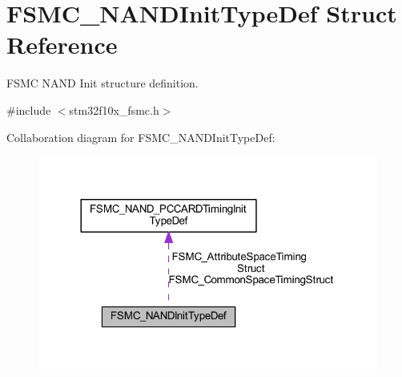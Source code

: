 \hypertarget{struct_f_s_m_c___n_a_n_d_init_type_def}{}\section{F\+S\+M\+C\+\_\+\+N\+A\+N\+D\+Init\+Type\+Def Struct Reference}
\label{struct_f_s_m_c___n_a_n_d_init_type_def}


F\+S\+MC N\+A\+ND Init structure definition.  




{\ttfamily \#include $<$stm32f10x\+\_\+fsmc.\+h$>$}



Collaboration diagram for F\+S\+M\+C\+\_\+\+N\+A\+N\+D\+Init\+Type\+Def\+:
\nopagebreak
\begin{figure}[H]
\begin{center}
\leavevmode
\includegraphics[width=317pt]{struct_f_s_m_c___n_a_n_d_init_type_def__coll__graph}
\end{center}
\end{figure}
